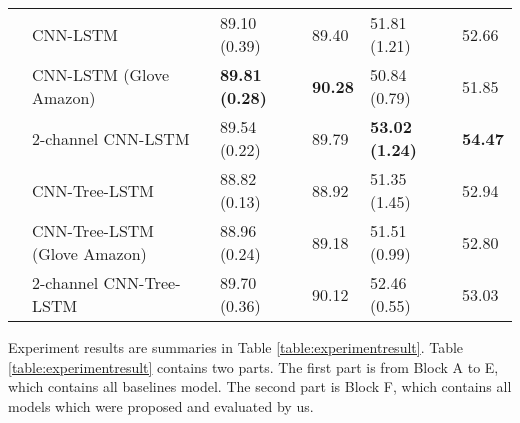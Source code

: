 \begin{table*}[]
\begin{tabular}{|c|l|ll|ll|}
		 & CNN-LSTM                                 & 89.10 (0.39)  & 89.40 & 51.81 (1.21) & 52.66 \\
		  & CNN-LSTM (Glove Amazon) & \textbf{89.81 (0.28)} & \textbf{90.28}  & 50.84 (0.79) & 51.85 \\
		& 2-channel CNN-LSTM                        & 89.54    (0.22) & 89.79 & \textbf{53.02 (1.24)} & \textbf{54.47} \\
		 & CNN-Tree-LSTM                            & 88.82 (0.13) & 88.92 & 51.35 (1.45) & 52.94 \\
		& CNN-Tree-LSTM (Glove Amazon)             & 88.96 (0.24) & 89.18 & 51.51 (0.99) & 52.80 \\
		& 2-channel CNN-Tree-LSTM  & 89.70 (0.36) & 90.12  & 52.46 (0.55) & 53.03 \Bstrut  \\
		\hline
	\end{tabular}
\end{table*}
Experiment results are summaries in Table \ref{table:experimentresult}.
Table \ref{table:experimentresult} contains two parts.
The first part is from Block A to E, which contains all baselines model.
The second part is Block F, which contains all models which were proposed and evaluated by us.
